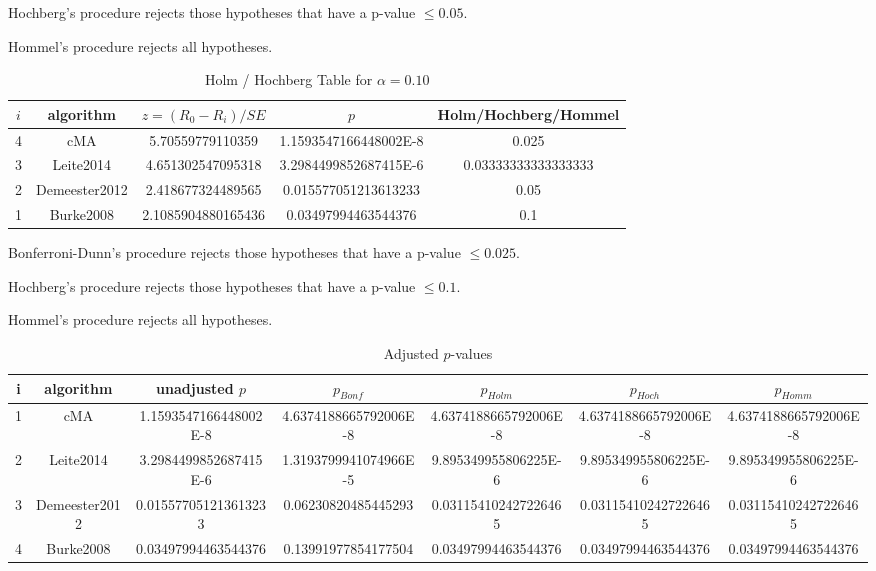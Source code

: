 \documentclass[a4paper,10pt]{article}
\begin{document}
\begin{landscape}
Hochberg's procedure rejects those hypotheses that have a p-value $\le0.05$.


Hommel's procedure rejects all hypotheses.


\begin{table}[!htp]
\centering\tiny
\caption{Holm / Hochberg Table for $\alpha=0.10$}
\begin{tabular}{ccccc}
$i$&algorithm&$z=(R_0 - R_i)/SE$&$p$&Holm/Hochberg/Hommel\\
\hline
4&cMA&5.70559779110359&1.1593547166448002E-8&0.025\\
3&Leite2014&4.651302547095318&3.2984499852687415E-6&0.03333333333333333\\
2&Demeester2012&2.418677324489565&0.015577051213613233&0.05\\
1&Burke2008&2.1085904880165436&0.03497994463544376&0.1\\
\hline
\end{tabular}
\end{table}
Bonferroni-Dunn's procedure rejects those hypotheses that have a p-value $\le0.025$.


Hochberg's procedure rejects those hypotheses that have a p-value $\le0.1$.


Hommel's procedure rejects all hypotheses.


\begin{table}[!htp]
\centering\tiny
\caption{Adjusted $p$-values}
\begin{tabular}{ccccccc}
i&algorithm&unadjusted $p$&$p_{Bonf}$&$p_{Holm}$&$p_{Hoch}$&$p_{Homm}$\\
\hline
1&cMA&1.1593547166448002E-8&4.6374188665792006E-8&4.6374188665792006E-8&4.6374188665792006E-8&4.6374188665792006E-8\\
2&Leite2014&3.2984499852687415E-6&1.3193799941074966E-5&9.895349955806225E-6&9.895349955806225E-6&9.895349955806225E-6\\
3&Demeester2012&0.015577051213613233&0.06230820485445293&0.031154102427226465&0.031154102427226465&0.031154102427226465\\
4&Burke2008&0.03497994463544376&0.13991977854177504&0.03497994463544376&0.03497994463544376&0.03497994463544376\\
\hline
\end{tabular}
\end{table}


\end{landscape}
\end{document}
